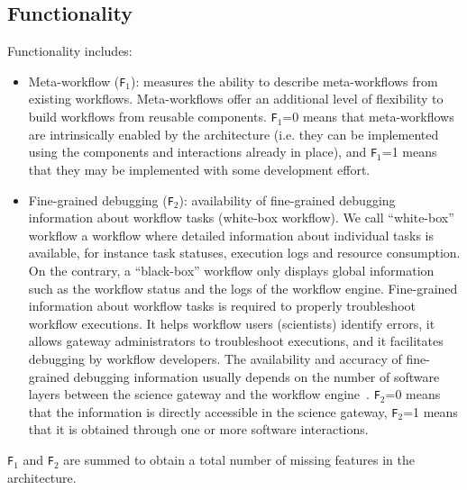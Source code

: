 \documentclass[preprint,3p,twocolumn]{elsarticle}
\newcommand{\correction}[1]{\color{blue}#1\color{black}\xspace}
\begin{document}
\subsection{\correction{Functionality}}

\correction{Functionality includes}:
\begin{itemize}[leftmargin=0cm,itemindent=0.35cm,itemsep=0cm]
\item Meta-workflow (\texttt{\correction{F}$_1$}): measures the ability to describe
  meta-workflows from existing workflows. Meta-workflows offer an
  additional level of flexibility to build workflows from reusable
  components. \texttt{\correction{F}$_1$}=0 means that meta-workflows are
  intrinsically enabled by the architecture (i.e. they can be
  implemented using the components and interactions already in place),
  and \texttt{\correction{F}$_1$}=1 means that they may be implemented with some
  development effort.
  
\item Fine-grained debugging (\texttt{\correction{F}$_2$}): availability of
  fine-grained debugging information about workflow tasks (white-box
  workflow). \correction{We call ``white-box'' workflow a workflow
    where detailed information about individual tasks is available,
    for instance task statuses, execution logs and resource
    consumption. On the contrary, a ``black-box'' workflow only
    displays global information such as the workflow status and the
    logs of the workflow engine.} Fine-grained information about
  workflow tasks is required to properly troubleshoot workflow
  executions. \correction{It helps workflow users (scientists)
    identify errors, it allows gateway administrators to troubleshoot
    executions, and it facilitates debugging by workflow
    developers}. \correction{The availability and accuracy of
    fine-grained debugging information} usually depends on the number
  of software layers between the science gateway and the workflow
  engine~\cite{olabarriaga2014}. \texttt{\correction{F}$_2$}=0 means that the
  information is directly accessible in the science gateway,
  \texttt{\correction{F}$_2$}=1 means that it is obtained through one or more
  software interactions.
\end{itemize}
\texttt{\correction{F}$_1$} and \texttt{\correction{F}$_2$} are summed to obtain a total number of missing 
features in the architecture.


\end{document}
